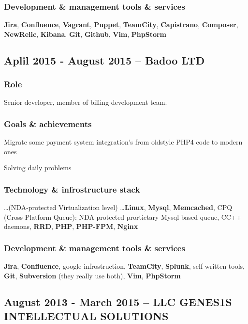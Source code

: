 \documentclass[10pt, a4paper, english]{article}
\begin{document}
    \subsubsection* {Development \& management tools \& services}
      \textbf{Jira}, \textbf{Confluence}, \textbf{Vagrant}, \textbf{Puppet}, \textbf{TeamCity},
      \textbf{Capistrano}, \textbf{Composer}, \textbf{NewRelic}, \textbf{Kibana}, \textbf{Git},
      \textbf{Github}, \textbf{Vim}, \textbf{PhpStorm}


  \subsection* {Aplil 2015 - August 2015 -- \textbf{Badoo LTD}}
    \subsubsection* {Role}
      Senior developer, member of billing development team.
    \subsubsection* {Goals \& achievements}
      \begin {list}{\textbullet}{}
        \item Migrate some payment system integration's from oldstyle PHP4 code to modern ones
        \item Solving daily problems
      \end{list}
    \subsubsection* {Technology \& infrostructure stack}
      \dots (NDA-protected Virtualization level) \dots\textbf{Linux}, \textbf{Mysql}, \textbf{Memcached},
      CPQ (Cross-Platform-Queue): NDA-protected prortietary Mysql-based queue, C\/C++ daemons, \textbf{RRD},
      \textbf{PHP}, \textbf{PHP-FPM}, \textbf{Nginx}
    \subsubsection* {Development \& management tools \& services}
      \textbf{Jira}, \textbf{Confluence}, google infrostruction, \textbf{TeamCity}, \textbf{Splunk},
      self-written tools, \textbf{Git}, \textbf{Subversion} (they really use both), \textbf{Vim},
      \textbf{PhpStorm}


  \subsection* {August 2013 - March 2015 -- \textbf{LLC GENES1S INTELLECTUAL SOLUTIONS}}
\end{document}
